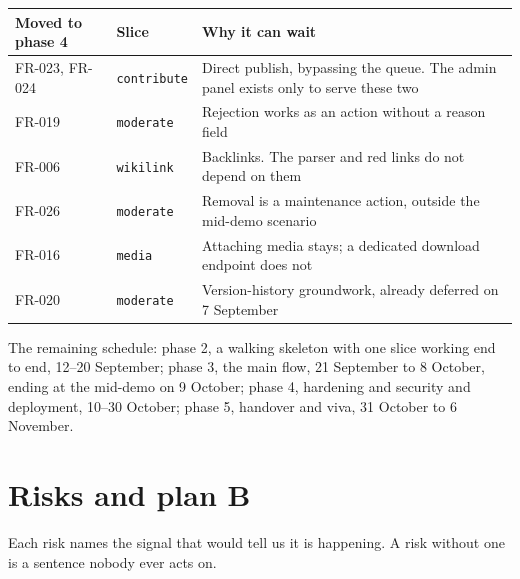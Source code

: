 \documentclass[11pt]{article}
\begin{document}
\vspace{0.4em}
\noindent\begin{tabular}{@{}llp{7.2cm}@{}}
\toprule
\textbf{Moved to phase 4} & \textbf{Slice} & \textbf{Why it can wait} \\
\midrule
FR-023, FR-024 & \texttt{contribute} & Direct publish, bypassing the queue. The admin panel exists only to serve these two \\
FR-019 & \texttt{moderate} & Rejection works as an action without a reason field \\
FR-006 & \texttt{wikilink} & Backlinks. The parser and red links do not depend on them \\
FR-026 & \texttt{moderate} & Removal is a maintenance action, outside the mid-demo scenario \\
FR-016 & \texttt{media} & Attaching media stays; a dedicated download endpoint does not \\
FR-020 & \texttt{moderate} & Version-history groundwork, already deferred on 7 September \\
\bottomrule
\end{tabular}

\vspace{0.6em}
\noindent The remaining schedule: phase 2, a walking skeleton with one slice working end to end,
12--20 September; phase 3, the main flow, 21 September to 8 October, ending at the mid-demo on
9 October; phase 4, hardening and security and deployment, 10--30 October; phase 5, handover and
viva, 31 October to 6 November.

\section{Risks and plan B}

Each risk names the signal that would tell us it is happening. A risk without one is a sentence
nobody ever acts on.
\end{document}
